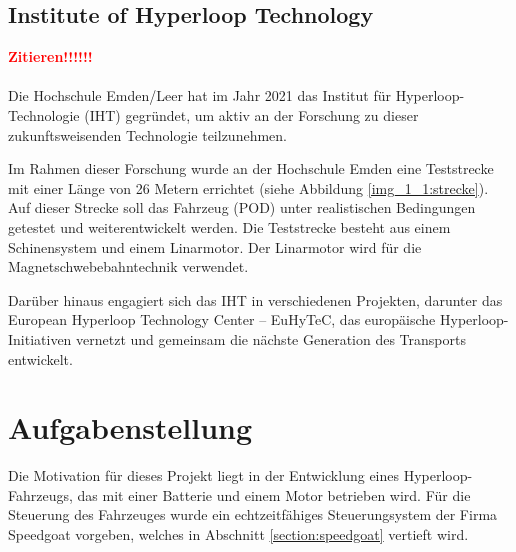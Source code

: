\subsection{Institute of Hyperloop Technology}
\label{section:IHT}

\textbf{\textcolor{red}{Zitieren!!!!!!}}\\ \ \\
Die Hochschule Emden/Leer hat im Jahr 2021 das Institut für Hyperloop-Technologie (IHT) gegründet, um aktiv an der Forschung zu dieser zukunftsweisenden Technologie teilzunehmen.

Im Rahmen dieser Forschung wurde an der Hochschule Emden eine Teststrecke mit einer Länge von 26 Metern errichtet (siehe Abbildung \ref{img_1_1:strecke}). Auf dieser Strecke soll das Fahrzeug (POD) unter realistischen Bedingungen getestet und weiterentwickelt werden.
Die Teststrecke besteht aus einem Schinensystem und einem Linarmotor. Der Linarmotor wird für die Magnetschwebebahntechnik verwendet.


Darüber hinaus engagiert sich das IHT in verschiedenen Projekten, darunter das \frqq European Hyperloop Technology Center – EuHyTeC\flqq, das europäische Hyperloop-Initiativen vernetzt und gemeinsam die nächste Generation des Transports entwickelt.
\newpage




\section{Aufgabenstellung}
\label{section:Aufgabenstellung}



Die Motivation für dieses Projekt liegt in der Entwicklung eines Hyperloop-Fahrzeugs, das mit einer Batterie und einem Motor betrieben wird. Für die Steuerung des Fahrzeuges wurde ein echtzeitfähiges Steuerungsystem der Firma Speedgoat vorgeben, welches in Abschnitt \ref{section:speedgoat} vertieft wird.\\ \ \\

